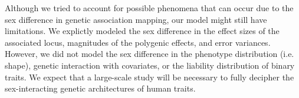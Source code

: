 \documentclass[11pt]{article}
\begin{document}


Although we tried to account for possible phenomena that can occur due to the sex difference in genetic association mapping, 
our model might still have limitations.
We explictly modeled the sex difference in the effect sizes of the associated locus, magnitudes of the polygenic effects, and error variances.
However, we did not model the sex difference in the phenotype distribution (i.e. shape), 
genetic interaction with covariates, or the liability distribution of binary traits.
We expect that a large-scale study will be necessary to fully decipher the 
sex-interacting genetic architectures of human traits. 


\end{document}
